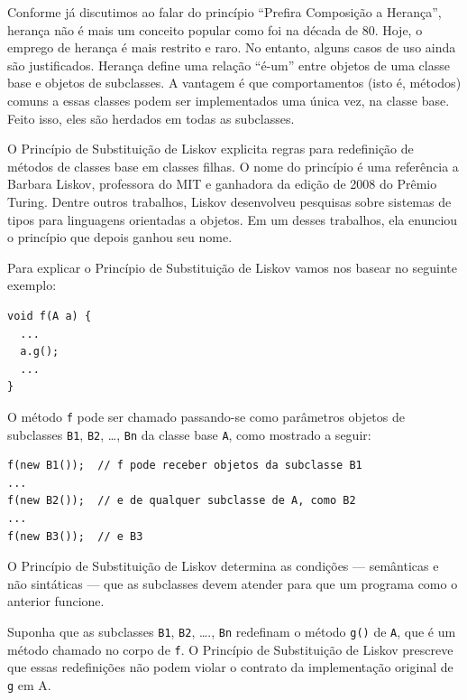 \documentclass[
  11pt,
  twoside]{book}
\newcommand{\passthrough}[1]{#1}
\begin{document}
Conforme já discutimos ao falar do princípio ``Prefira Composição a
Herança'', herança não é mais um conceito popular como foi na década de
80. Hoje, o emprego de herança é mais restrito e raro. No entanto,
alguns casos de uso ainda são justificados. Herança define uma relação
``é-um'' entre objetos de uma classe base e objetos de subclasses. A
vantagem é que comportamentos (isto é, métodos) comuns a essas classes
podem ser implementados uma única vez, na classe base. Feito isso, eles
são herdados em todas as subclasses.

 O Princípio de Substituição de Liskov explicita
regras para redefinição de métodos de classes base em classes filhas. O
nome do princípio é uma referência a Barbara Liskov, professora do MIT e
ganhadora da edição de 2008 do Prêmio Turing. Dentre outros trabalhos,
Liskov desenvolveu pesquisas sobre sistemas de tipos para linguagens
orientadas a objetos. Em um desses trabalhos, ela enunciou o princípio
que depois ganhou seu nome.

Para explicar o Princípio de Substituição de Liskov vamos nos basear no
seguinte exemplo:

\begin{lstlisting}
void f(A a) {
  ...
  a.g();
  ...
}
\end{lstlisting}

O método \passthrough{\lstinline!f!} pode ser chamado passando-se como
parâmetros objetos de subclasses \passthrough{\lstinline!B1!},
\passthrough{\lstinline!B2!}, \ldots, \passthrough{\lstinline!Bn!} da
classe base \passthrough{\lstinline!A!}, como mostrado a seguir:

\begin{lstlisting}
f(new B1());  // f pode receber objetos da subclasse B1 
...
f(new B2());  // e de qualquer subclasse de A, como B2
...
f(new B3());  // e B3
\end{lstlisting}

O Princípio de Substituição de Liskov determina as condições ---
semânticas e não sintáticas --- que as subclasses devem atender para que
um programa como o anterior funcione.

Suponha que as subclasses \passthrough{\lstinline!B1!},
\passthrough{\lstinline!B2!}, \ldots., \passthrough{\lstinline!Bn!}
redefinam o método \passthrough{\lstinline!g()!} de
\passthrough{\lstinline!A!}, que é um método chamado no corpo de
\passthrough{\lstinline!f!}. O Princípio de Substituição de Liskov
prescreve que essas redefinições não podem violar o contrato da
implementação original de \passthrough{\lstinline!g!} em A.
\end{document}
